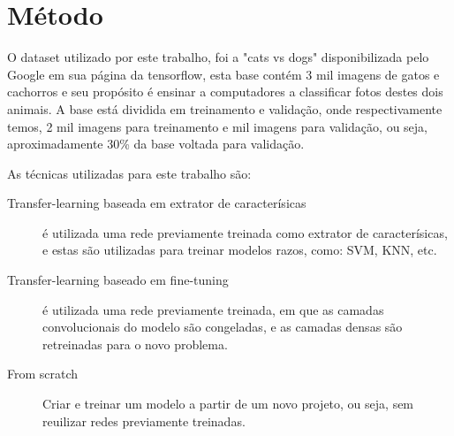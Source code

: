 \section{Método}

O dataset utilizado por este trabalho, foi a "cats vs dogs" disponibilizada pelo Google em sua página da tensorflow, esta base contém 3 mil imagens de gatos e cachorros e seu propósito é ensinar a computadores a classificar fotos destes dois animais.
A base está dividida em treinamento e validação, onde respectivamente temos, 2 mil imagens para treinamento e mil imagens para validação, ou seja, aproximadamente 30\% da base voltada para validação.

As técnicas utilizadas para este trabalho são:

 \begin{description}
	\item[Transfer-learning baseada em extrator de caracterísicas] é utilizada uma rede previamente treinada como extrator de caracterísicas, e estas são utilizadas para treinar modelos razos, como: SVM, KNN, etc.
	\item[Transfer-learning baseado em fine-tuning] é utilizada uma rede previamente treinada, em que as camadas convolucionais do modelo são congeladas, e as camadas densas são retreinadas para o novo problema.
	\item[From scratch] Criar e treinar um modelo a partir de um novo projeto, ou seja, sem reuilizar redes previamente treinadas.
\end{description}




